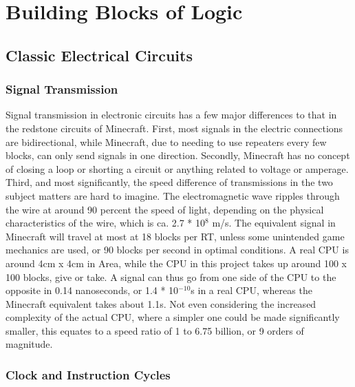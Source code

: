 \chapter{Building Blocks of Logic} %

\label{Chapter1}


\section{Classic Electrical Circuits}

\subsection{Signal Transmission}
Signal transmission in electronic circuits has a few major differences to that in the redstone circuits of Minecraft. First, most signals in the electric connections are bidirectional, while Minecraft, due to needing to use repeaters every few blocks, can only send signals in one direction. Secondly, Minecraft has no concept of closing a loop or shorting a circuit or anything related to voltage or amperage. Third, and most significantly, the speed difference of transmissions in the two subject matters are hard to imagine. The electromagnetic wave ripples through the wire at around 90 percent the speed of light, depending on the physical characteristics of the wire, which is ca. 2.7 * 10$^8$ m/s. The equivalent signal in Minecraft will travel at most at 18 blocks per RT, unless some unintended game mechanics are used, or 90 blocks per second in optimal conditions. A real CPU is around 4cm x 4cm in Area, while the CPU in this project takes up around 100 x 100 blocks, give or take. A signal can thus go from one side of the CPU to the opposite in 0.14 nanoseconds, or 1.4 * 10$^{-10}$s in a real CPU, whereas the Minecraft equivalent takes about 1.1s. Not even considering the increased complexity of the actual CPU, where a simpler one could be made significantly smaller, this equates to a speed ratio of 1 to 6.75 billion, or 9 orders of magnitude.

\subsection{Clock and Instruction Cycles}


